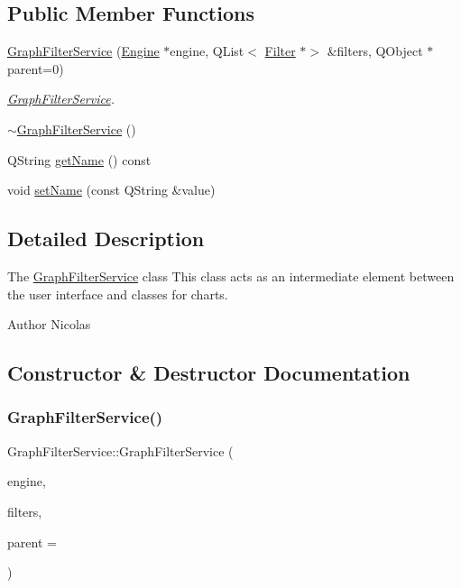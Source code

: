 \subsection*{Public Member Functions}
\begin{DoxyCompactItemize}
\item 
\hyperlink{class_graph_filter_service_af10b79e7d0a0736df08ab20733311b67}{Graph\+Filter\+Service} (\hyperlink{class_engine}{Engine} $\ast$engine, Q\+List$<$ \hyperlink{class_filter}{Filter} $\ast$$>$ \&filters, Q\+Object $\ast$parent=0)
\begin{DoxyCompactList}\small\item\em \hyperlink{class_graph_filter_service}{Graph\+Filter\+Service}. \end{DoxyCompactList}\item 
\hyperlink{class_graph_filter_service_a9036ef6a3b6348698c9386e71371d488}{$\sim$\+Graph\+Filter\+Service} ()
\item 
Q\+String \hyperlink{class_graph_filter_service_a16e88d8a688024ab96a4e3ed6a19e238}{get\+Name} () const
\item 
void \hyperlink{class_graph_filter_service_abcbd3365d2c735616f61de87a0af8ea4}{set\+Name} (const Q\+String \&value)
\end{DoxyCompactItemize}


\subsection{Detailed Description}
The \hyperlink{class_graph_filter_service}{Graph\+Filter\+Service} class This class acts as an intermediate element between the user interface and classes for charts. 

\begin{DoxyAuthor}{Author}
Nicolas 
\end{DoxyAuthor}


\subsection{Constructor \& Destructor Documentation}
\hypertarget{class_graph_filter_service_af10b79e7d0a0736df08ab20733311b67}{}\label{class_graph_filter_service_af10b79e7d0a0736df08ab20733311b67} 
\subsubsection{\texorpdfstring{Graph\+Filter\+Service()}{GraphFilterService()}}
{\footnotesize\ttfamily Graph\+Filter\+Service\+::\+Graph\+Filter\+Service (\begin{DoxyParamCaption}\item[{\hyperlink{class_engine}{Engine} $\ast$}]{engine,  }\item[{Q\+List$<$ \hyperlink{class_filter}{Filter} $\ast$$>$ \&}]{filters,  }\item[{Q\+Object $\ast$}]{parent = {} }\end{DoxyParamCaption})}



